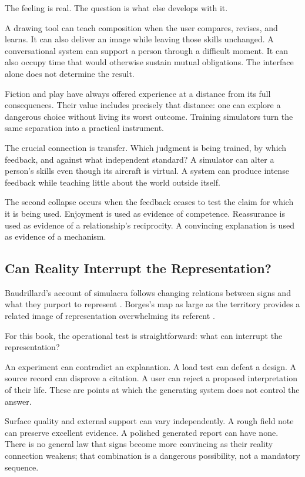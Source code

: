 \documentclass[11pt,openany]{book}
\begin{document}
The feeling is real. The question is what else develops with it.

A drawing tool can teach composition when the user compares, revises, and learns. It can also deliver an image while leaving those skills unchanged. A conversational system can support a person through a difficult moment. It can also occupy time that would otherwise sustain mutual obligations. The interface alone does not determine the result.

Fiction and play have always offered experience at a distance from its full consequences. Their value includes precisely that distance: one can explore a dangerous choice without living its worst outcome. Training simulators turn the same separation into a practical instrument.

The crucial connection is transfer. Which judgment is being trained, by which feedback, and against what independent standard? A simulator can alter a person's skills even though its aircraft is virtual. A system can produce intense feedback while teaching little about the world outside itself.

The second collapse occurs when the feedback ceases to test the claim for which it is being used. Enjoyment is used as evidence of competence. Reassurance is used as evidence of a relationship's reciprocity. A convincing explanation is used as evidence of a mechanism.

\subsection{Can Reality Interrupt the Representation?}

Baudrillard's account of simulacra follows changing relations between signs and what they purport to represent \cite{baudrillard1981simulacres}. Borges's map as large as the territory provides a related image of representation overwhelming its referent \cite{borges1946rigor}.

For this book, the operational test is straightforward: what can interrupt the representation?

An experiment can contradict an explanation. A load test can defeat a design. A source record can disprove a citation. A user can reject a proposed interpretation of their life. These are points at which the generating system does not control the answer.

Surface quality and external support can vary independently. A rough field note can preserve excellent evidence. A polished generated report can have none. There is no general law that signs become more convincing as their reality connection weakens; that combination is a dangerous possibility, not a mandatory sequence.
\end{document}
